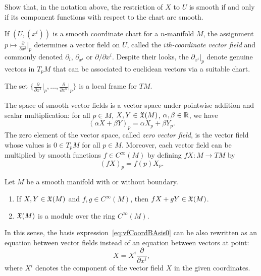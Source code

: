 \begin{exercise}[\textit{[homework 2]}]
  Show that, in the notation above, the restriction of $X$ to $U$ is smooth if and only if its component functions with respect to the chart are smooth.
\end{exercise}

\begin{example}
  If $(U, (x^i))$ is a smooth coordinate chart for a $n$-manifold $M$, the assignment $p \mapsto \frac{\partial}{\partial x^i}\big|_p$ determines a vector field on $U$, called the \emph{$i$th-coordinate vector field} and commonly denoted $\partial_{i}$, $\partial_{x^i}$ or $\partial/\partial x^i$.
  Despite their looks, the $\partial_{x^i}|_p$ denote genuine vectors in $T_p M$ that can be associated to euclidean vectors via a suitable chart.

  The set $\{\frac{\partial}{\partial x^1}\big|_p, \ldots, \frac{\partial}{\partial x^n}\big|_p\}$ is a local frame for $TM$.
\end{example}

The space of smooth vector fields is a vector space under pointwise addition and scalar multiplication: for all $p\in M$, $X,Y\in\mathfrak{X}(M)$, $\alpha, \beta \in \mathbb{R}$, we have
\begin{equation}
  (\alpha X + \beta Y)_p = \alpha X_p + \beta Y_p.
\end{equation}
The zero element of the vector space, called \emph{zero vector field}, is the vector field whose values is $0\in T_pM$ for all $p\in M$.
Moreover, each vector field can be multiplied by smooth functions $f\in C^\infty(M)$ by defining $fX:M\to  TM$ by
\begin{equation}
  (fX)_p = f(p)X_p.
\end{equation}

\begin{proposition}
  Let $M$ be a smooth manifold with or without boundary.
  \begin{enumerate}
    \item If $X,Y \in \mathfrak{X}(M)$ and $f,g\in C^\infty(M)$, then $fX+gY \in\mathfrak{X}(M)$.
    \item $\mathfrak{X}(M)$ is a module over the ring $C^\infty(M)$.
  \end{enumerate}
\end{proposition}

In this sense, the basis expression~\eqref{eq:vfCoordBAsis0} can be also rewritten as an equation between vector fields instead of an equation between vectors at point:
\begin{equation}\label{eq:vfCoordBAsis}
  X = X^i \frac{\partial}{\partial x^i},
\end{equation}
where $X^i$ denotes the component of the vector field $X$ in the given coordinates.

